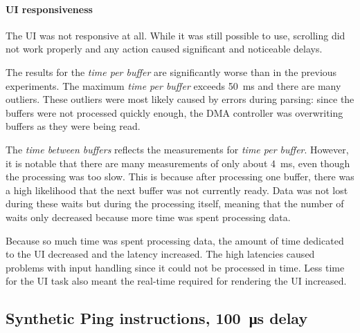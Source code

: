 \paragraph{UI responsiveness}

The UI was not responsive at all. While it was still possible to use, scrolling did not work properly
and any action caused significant and noticeable delays.
\bigbreak

The results for the \textit{time per buffer} are significantly worse than in the previous experiments.
The maximum \textit{time per buffer} exceeds \SI{50}{\milli\second} and there are many outliers.
These outliers were most likely caused by errors during parsing: since the buffers were not processed
quickly enough, the DMA controller was overwriting buffers as they were being read.

The \textit{time between buffers} reflects the measurements for \textit{time per buffer}. However,
it is notable that there are many measurements of only about \SI{4}{\milli\second}, even though the
processing was too slow. This is because after processing one buffer, there was a high likelihood
that the next buffer was not currently ready. Data was not lost during these waits but during the
processing itself, meaning that the number of waits only decreased because more time was spent
processing data.

Because so much time was spent processing data, the amount of time dedicated to the UI decreased and
the latency increased. The high latencies caused problems with input handling since it could not be
processed in time. Less time for the UI task also meant the real-time required for rendering the UI
increased.

\clearpage
\subsection{Synthetic Ping instructions, \SI{100}{\micro\second} delay}
\label{evaluation/results/synthetic-ping-instructions-100us-delay}

